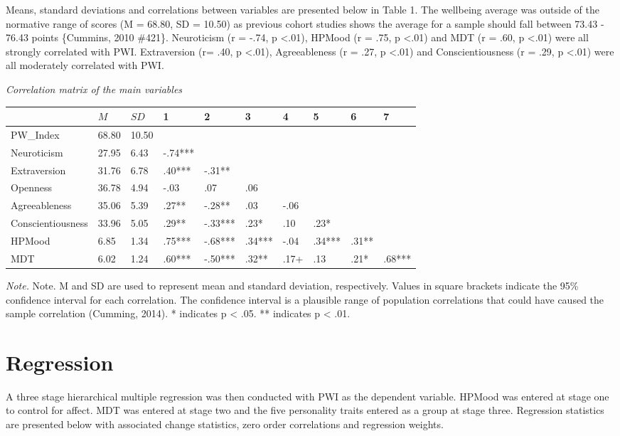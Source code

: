 \documentclass[man,floatsintext]{apa6}
\begin{document}
Means, standard deviations and correlations between variables are
presented below in Table 1. The wellbeing average was outside of the
normative range of scores (M = 68.80, SD = 10.50) as previous cohort
studies shows the average for a sample should fall between 73.43 - 76.43
points \{Cummins, 2010 \#421\}. Neuroticism (r = -.74, p
\textless{}.01), HPMood (r = .75, p \textless{}.01) and MDT (r = .60, p
\textless{}.01) were all strongly correlated with PWI. Extraversion (r=
.40, p \textless{}.01), Agreeableness (r = .27, p \textless{}.01) and
Conscientiousness (r = .29, p \textless{}.01) were all moderately
correlated with PWI.

\label{tab:unnamed-chunk-1}

\emph{Correlation matrix of the main variables}

\begin{longtable}[]{@{}llllllllll@{}}
\toprule
& \(M\) & \(SD\) & 1 & 2 & 3 & 4 & 5 & 6 & 7\tabularnewline
\midrule
\endhead
PW\_Index & 68.80 & 10.50 & & & & & & &\tabularnewline
Neuroticism & 27.95 & 6.43 & -.74*** & & & & & &\tabularnewline
Extraversion & 31.76 & 6.78 & .40*** & -.31** & & & & &\tabularnewline
Openness & 36.78 & 4.94 & -.03 & .07 & .06 & & & &\tabularnewline
Agreeableness & 35.06 & 5.39 & .27** & -.28** & .03 & -.06 & &
&\tabularnewline
Conscientiousness & 33.96 & 5.05 & .29** & -.33*** & .23* & .10 & .23* &
&\tabularnewline
HPMood & 6.85 & 1.34 & .75*** & -.68*** & .34*** & -.04 & .34*** & .31**
&\tabularnewline
MDT & 6.02 & 1.24 & .60*** & -.50*** & .32** & .17+ & .13 & .21* &
.68***\tabularnewline
\bottomrule
\end{longtable}

\emph{Note.} Note. M and SD are used to represent mean and standard
deviation, respectively. Values in square brackets indicate the 95\%
confidence interval for each correlation. The confidence interval is a
plausible range of population correlations that could have caused the
sample correlation (Cumming, 2014). * indicates p \textless{} .05. **
indicates p \textless{} .01.

\section{Regression}\label{regression}

A three stage hierarchical multiple regression was then conducted with
PWI as the dependent variable. HPMood was entered at stage one to
control for affect. MDT was entered at stage two and the five
personality traits entered as a group at stage three. Regression
statistics are presented below with associated change statistics, zero
order correlations and regression weights.
\end{document}

